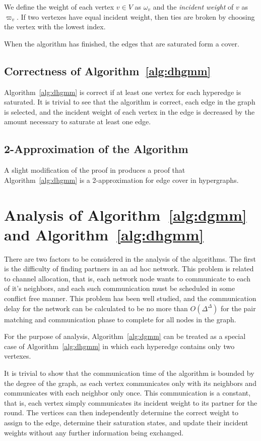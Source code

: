 We define the weight of each vertex $v \in V$ as $\omega_v$ and the {\em incident weight} of $v$ as $\varpi_v$. If two vertexes have equal incident weight, then ties are broken by choosing the vertex with the lowest index.



When the algorithm has finished, the edges that are saturated form a cover.
\subsection{Correctness of Algorithm~\ref{alg:dhgmm}}
Algorithm~\ref{alg:dhgmm} is correct if at least one vertex for each hyperedge is saturated. It is trivial to see that the algorithm is correct, each edge in the graph is selected, and the incident weight of each vertex in the edge is decreased by the amount necessary to saturate at least one edge.
\subsection{2-Approximation of the Algorithm}
A slight modification of the proof in \cite{Gonzalez1995129} produces a proof that Algorithm~\ref{alg:dhgmm} is a 2-approximation for edge cover in hypergraphs.


\section{Analysis of Algorithm~\ref{alg:dgmm} and Algorithm~\ref{alg:dhgmm}}
There are two factors to be considered in the analysis of the algorithms. The first is the difficulty of finding partners in an ad hoc network. This problem is related to channel allocation, that is, each network node wants to communicate to each of it's neighbors, and each such communication must be scheduled in some conflict free manner. This problem has been well studied, and the communication delay for the network can be calculated to be no more than $O(\Delta^{\Delta})$ for the pair matching and communication phase to complete for all nodes in the graph.\cite{4053985}

For the purpose of analysis, Algorithm~\ref{alg:dgmm} can be treated as a special case of Algorithm~\ref{alg:dhgmm} in which each hyperedge contains only two vertexes.
 
It is trivial to show that the communication time of the algorithm is bounded by the degree of the graph, as each vertex communicates only with its neighbors and communicates with each neighbor only once. This communication is a constant, that is, each vertex simply communicates its incident weight to its partner for the round. The vertices can then independently determine the correct weight to assign to the edge, determine their saturation states, and update their incident weights without any further information being exchanged.


